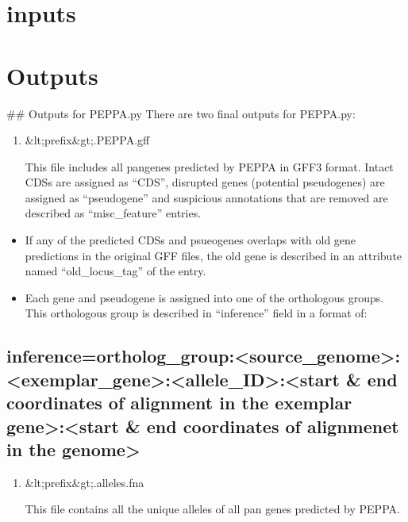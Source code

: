 \documentclass[letterpaper,10pt,english]{sphinxmanual}
\begin{document}
{\color{red}\bfseries{}\textasciigrave{}\textasciigrave{}}{\color{red}\bfseries{}\textasciigrave{}}


\chapter{inputs}
\label{\detokenize{usage/inputs:inputs}}\label{\detokenize{usage/inputs::doc}}

\chapter{Outputs}
\label{\detokenize{usage/outputs:outputs}}\label{\detokenize{usage/outputs::doc}}
\#\# Outputs for PEPPA.py
There are two final outputs for PEPPA.py:
\begin{enumerate}
%
\item {} 
\&lt;prefix\&gt;.PEPPA.gff

This file includes all pan\sphinxhyphen{}genes predicted by PEPPA in GFF3 format. Intact CDSs are assigned as “CDS”, disrupted genes (potential pseudogenes) are assigned as “pseudogene” and suspicious annotations that are removed are described as “misc\_feature” entries.

\end{enumerate}
\begin{itemize}
\item {} 
If any of the predicted CDSs and psueogenes overlaps with old gene predictions in the original GFF files, the old gene is described in an attribute named “old\_locus\_tag” of the entry.

\item {} 
Each gene and pseudogene is assigned into one of the orthologous groups. This orthologous group is described in “inference” field in a format of:

\end{itemize}


\section{inference=ortholog\_group:\textless{}source\_genome\textgreater{}:\textless{}exemplar\_gene\textgreater{}:\textless{}allele\_ID\textgreater{}:\textless{}start \& end coordinates of alignment in the exemplar gene\textgreater{}:\textless{}start \& end coordinates of alignmenet in the genome\textgreater{}}
\label{\detokenize{usage/outputs:inference-ortholog-group-source-genome-exemplar-gene-allele-id-start-end-coordinates-of-alignment-in-the-exemplar-gene-start-end-coordinates-of-alignmenet-in-the-genome}}\begin{enumerate}
%
\setcounter{enumi}{1}
\item {} 
\&lt;prefix\&gt;.alleles.fna

This file contains all the unique alleles of all pan genes predicted by PEPPA.

\end{enumerate}
\end{document}
